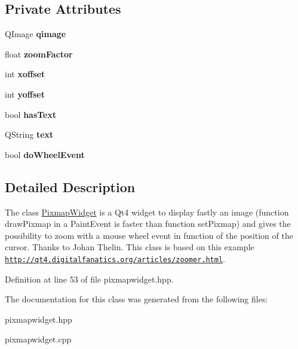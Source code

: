 \subsection*{Private Attributes}
\begin{DoxyCompactItemize}
\item 
\hypertarget{classofeli_1_1_pixmap_widget_aa9185a44438e16a0a423cb353f9ddacd}{Q\-Image {\bfseries qimage}}\label{classofeli_1_1_pixmap_widget_aa9185a44438e16a0a423cb353f9ddacd}

\item 
\hypertarget{classofeli_1_1_pixmap_widget_a621299723d4edde9cb4454ac4dfb3200}{float {\bfseries zoom\-Factor}}\label{classofeli_1_1_pixmap_widget_a621299723d4edde9cb4454ac4dfb3200}

\item 
\hypertarget{classofeli_1_1_pixmap_widget_adfedb996ccee157d87581a60af4dd278}{int {\bfseries xoffset}}\label{classofeli_1_1_pixmap_widget_adfedb996ccee157d87581a60af4dd278}

\item 
\hypertarget{classofeli_1_1_pixmap_widget_a7ca491af4dcb996a2af7eb9ae9f6a3ee}{int {\bfseries yoffset}}\label{classofeli_1_1_pixmap_widget_a7ca491af4dcb996a2af7eb9ae9f6a3ee}

\item 
\hypertarget{classofeli_1_1_pixmap_widget_a3da7d16f1a12fc64a85860ccb1f09598}{bool {\bfseries has\-Text}}\label{classofeli_1_1_pixmap_widget_a3da7d16f1a12fc64a85860ccb1f09598}

\item 
\hypertarget{classofeli_1_1_pixmap_widget_a1a75f2bd4da1f85d1e8ab3880dc76dbf}{Q\-String {\bfseries text}}\label{classofeli_1_1_pixmap_widget_a1a75f2bd4da1f85d1e8ab3880dc76dbf}

\item 
\hypertarget{classofeli_1_1_pixmap_widget_a9cbffb16d41dbaa2d0f6fc787c69966c}{bool {\bfseries do\-Wheel\-Event}}\label{classofeli_1_1_pixmap_widget_a9cbffb16d41dbaa2d0f6fc787c69966c}

\end{DoxyCompactItemize}


\subsection{Detailed Description}
The class \hyperlink{classofeli_1_1_pixmap_widget}{Pixmap\-Widget} is a Qt4 widget to display fastly an image (function draw\-Pixmap in a Paint\-Event is faster than function set\-Pixmap) and gives the possibility to zoom with a mouse wheel event in function of the position of the cursor. Thanks to Johan Thelin. This class is based on this example \href{http://qt4.digitalfanatics.org/articles/zoomer.html}{\tt http\-://qt4.\-digitalfanatics.\-org/articles/zoomer.\-html}. 

Definition at line 53 of file pixmapwidget.\-hpp.



The documentation for this class was generated from the following files\-:\begin{DoxyCompactItemize}
\item 
pixmapwidget.\-hpp\item 
pixmapwidget.\-cpp\end{DoxyCompactItemize}
